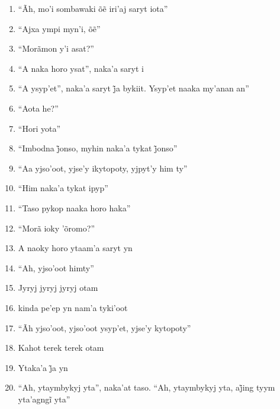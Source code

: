 \begin{enumerate}
 \item ``Ãh, mo’i sombawaki õẽ iri’aj saryt iota''

 \item ``Ajxa ympi myn’i, õẽ''

 \item ``Morãmon y'i asat?''

 \item ``A naka horo ysat'', naka'a saryt i

 \item ``A ysyp’et'', naka’a saryt j̃a bykiit. Ysyp’et naaka my’anan an''

 \begin{center}\end{center}

 \item ``Aota he?''

 \item ``Hori yota''

 \item ``Imbodna j̃onso, myhin naka’a tykat j̃onso''

 \item ``Aa yjso'oot, yjse'y ikytopoty, yjpyt'y him ty''

 \item ``Him naka'a tykat ipyp''

 \item ``Taso pykop naaka horo haka''

 \item ``Morã ioky 'õromo?''

 \item A naoky horo ytaam'a saryt yn

 \item ``Ah, yjso'oot himty''

 \item Jyryj jyryj jyryj otam

 \item kinda pe'ep yn nam'a tyki'oot

 \item ``Ãh yjso'oot, yjso'oot ysyp'et, yjse'y kytopoty''

 \begin{center}\end{center}

 \item Kahot terek terek otam

 \item Ytaka’a j̃a yn

 \item ``Ah, ytaymbykyj yta'', naka’at taso. ``Ah, ytaymbykyj yta, aj̃ing tyym yta’agngĩ yta''


\end{enumerate}
